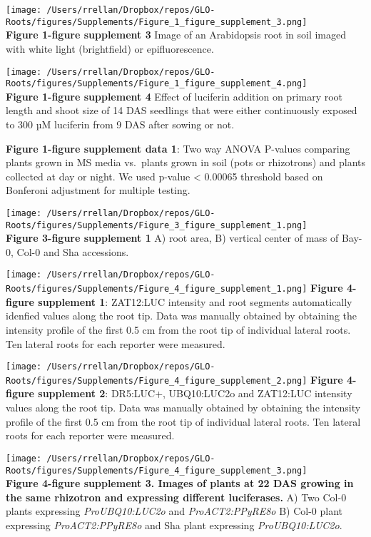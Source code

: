 \documentclass[]{article}
\begin{document}
\texttt{[image: /Users/rrellan/Dropbox/repos/GLO-Roots/figures/Supplements/Figure\_1\_figure\_supplement\_3.png]}\\\textbf{Figure
1-figure supplement 3} Image of an Arabidopsis root in soil imaged with
white light (brightfield) or epifluorescence.



\texttt{[image: /Users/rrellan/Dropbox/repos/GLO-Roots/figures/Supplements/Figure\_1\_figure\_supplement\_4.png]}\\\textbf{Figure
1-figure supplement 4} Effect of luciferin addition on primary root
length and shoot size of 14 DAS seedlings that were either continuously
exposed to 300 µM luciferin from 9 DAS after sowing or not.



\textbf{Figure 1-figure supplement data 1}: Two way ANOVA P-values
comparing plants grown in MS media vs.~plants grown in soil (pots or
rhizotrons) and plants collected at day or night. We used p-value
\textless{} 0.00065 threshold based on Bonferoni adjustment for multiple
testing.



\texttt{[image: /Users/rrellan/Dropbox/repos/GLO-Roots/figures/Supplements/Figure\_3\_figure\_supplement\_1.png]}\\\textbf{Figure
3-figure supplement 1} A) root area, B) vertical center of mass of
Bay-0, Col-0 and Sha accessions.



\texttt{[image: /Users/rrellan/Dropbox/repos/GLO-Roots/figures/Supplements/Figure\_4\_figure\_supplement\_1.png]}
\textbf{Figure 4-figure supplement 1}: ZAT12:LUC intensity and root
segments automatically idenfied values along the root tip. Data was
manually obtained by obtaining the intensity profile of the first 0.5 cm
from the root tip of individual lateral roots. Ten lateral roots for
each reporter were measured.

\texttt{[image: /Users/rrellan/Dropbox/repos/GLO-Roots/figures/Supplements/Figure\_4\_figure\_supplement\_2.png]}
\textbf{Figure 4-figure supplement 2}: DR5:LUC+, UBQ10:LUC2o and
ZAT12:LUC intensity values along the root tip. Data was manually
obtained by obtaining the intensity profile of the first 0.5 cm from the
root tip of individual lateral roots. Ten lateral roots for each
reporter were measured.

\texttt{[image: /Users/rrellan/Dropbox/repos/GLO-Roots/figures/Supplements/Figure\_4\_figure\_supplement\_3.png]}\\\textbf{Figure
4-figure supplement 3. Images of plants at 22 DAS growing in the same
rhizotron and expressing different luciferases.} A) Two Col-0 plants
expressing \emph{ProUBQ10:LUC2o} and \emph{ProACT2:PPyRE8o} B) Col-0
plant expressing \emph{ProACT2:PPyRE8o} and Sha plant expressing
\emph{ProUBQ10:LUC2o}.
\end{document}
